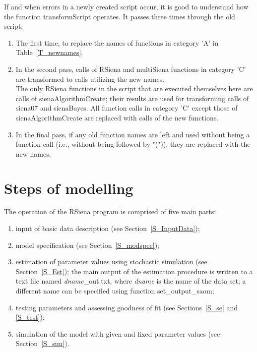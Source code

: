 \documentclass[a4paper,fleqn,11pt]{article}
\newcommand{\+}{\, + \,}
\newcommand{\sfn}[1]{\textsf{#1}}
\newcommand{\RS}{{\sf \textsf{RSiena} }}
\newcommand{\MS}{{\sf multiSiena }}
\begin{document}
\newpage

If and when errors in a newly created script occur,
it is good to understand how the function  \sfn{transformScript}
operates.
It passes three times through the old script:
\begin{enumerate}
  \item The first time, to replace the names of functions in category
    'A' in Table~\ref{T_newnames}.
  \item In the second pass,   calls of \RS and
     \MS functions in category 'C'
     are transformed to calls utilizing the new names.\\
     The only \RS functions in the script
     that are executed themselves here are calls of \sfn{sienaAlgorithmCreate};
     their results are used for transforming
     calls of \sfn{siena07} and \sfn{sienaBayes}.
     All  function calls in category 'C' except those of
      \sfn{sienaAlgorithmCreate} are replaced with
      calls of the new functions.
  \item In the final pass, if any old function names are left and used
     without being a function call (i.e., without being
     followed by "(")), they are replaced with the new names.
\end{enumerate}


\clearpage

\section{Steps of modelling}
\label{S_parts}

The operation of the \RS program is comprised of five main parts:
\begin{enumerate}
 \item input of basic data description (see Section~\ref{S_InputData});
 \item model specification (see Section~\ref{S_modspec});
 \item estimation of parameter values using stochastic simulation
        (see Section~\ref{S_Est});
    the main output of the estimation procedure
    is written to a text file named
    \textsf{\textsl{dname}\_out.txt}, where \textsf{\textsl{dname}} is the name
   of the data set; a different name can be specified
   using function  \sfn{set\_output\_saom};
 \item testing parameters and assessing goodness of fit
        (see Sections~\ref{S_se} and \ref{S_test});
 \item simulation of the model with given and fixed parameter values
        (see Section~\ref{S_sim}).
\end{enumerate}
\end{document}
